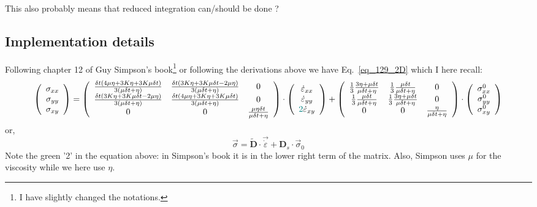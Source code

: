 This also probably means that reduced integration can/should be done ?

\subsection*{Implementation details}

Following chapter 12 of Guy Simpson's book\footnote{I have slightly changed the notations.} \cite{simp17} 
or following the derivations above we have Eq.~\eqref{eq_129_2D}
which I here recall:
{\small
\[
\left(
\begin{array}{c}
\sigma_{xx}\\ 
\sigma_{yy}\\ 
\sigma_{xy} 
\end{array}
\right)
=
\left(
\begin{array}{ccc}
\frac{\delta t(4\mu \eta + 3K \eta+ 3K \mu\delta t)}{3(\mu \delta t + \eta)} &
\frac{\delta t(3K \eta+ 3K \mu\delta t - 2\mu \eta)}{3(\mu \delta t + \eta)} &
0 \\
\frac{\delta t(3K \eta+ 3K \mu\delta t  - 2\mu \eta)}{3(\mu \delta t + \eta)}&
\frac{\delta t(4\mu \eta + 3K \eta+ 3K \mu\delta t)}{3(\mu \delta t + \eta)} &
0  \\
0 & 0 & \frac{\mu \eta \delta t }{\mu \delta t + \eta}  \\
\end{array}
\right)
\cdot
\left(
\begin{array}{c}
\dot\varepsilon_{xx}\\ 
\dot\varepsilon_{yy}\\ 
{\color{teal}2}\dot\varepsilon_{xy} 
\end{array}
\right) 
+
\left(
\begin{array}{cccccc}
\frac13\frac{3\eta + \mu \delta t}{\mu\delta t+\eta} & 
\frac13\frac{\mu \delta t}{\mu\delta t+\eta} & 
0\\
\frac13\frac{\mu \delta t}{\mu\delta t+\eta} & 
\frac13\frac{3\eta + \mu \delta t}{\mu\delta t+\eta} & 
0\\
0 & 0 & \frac{ \eta}{\mu\delta t + \eta}  
\end{array}
\right)
\cdot
\left(
\begin{array}{c}
\sigma_{xx}^0\\ 
\sigma_{yy}^0\\ 
\sigma_{xy}^0 
\end{array}
\right) 
\]}
or, 
\[
\vec{\sigma} = \tilde{\bm D}\cdot \vec{\dot{\varepsilon}} +
{\bm D}_s \cdot \vec{\sigma}_0 
\]
Note the green '2' in the equation above: in Simpson's book it is in the
lower right term of the matrix. Also, Simpson uses $\mu$ for the viscosity
while we here use $\eta$. 

